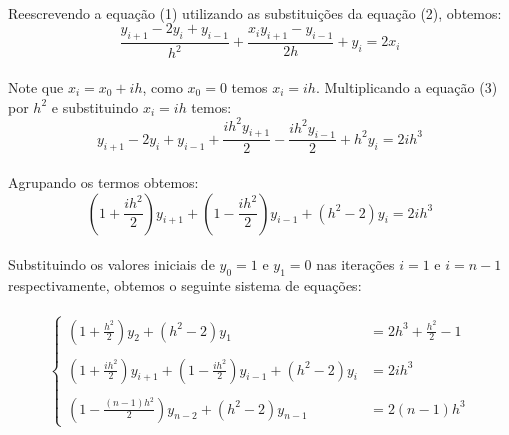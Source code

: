\documentclass{coursepaper}
\begin{document}
        \paragraph{}
            Reescrevendo a equação (1) utilizando as substituições da equação (2), obtemos:
            \begin{equation}
                \frac{y_{i+1} - 2y_{i} + y_{i-1}}{h^2} + \frac{x_{i} y_{i+1} - y_{i-1}}{2h} + y_{i} = 2x_{i}
            \end{equation}
        \paragraph{}
            Note que $x_{i} = x_{0} + ih$, como $x_{0} = 0$ temos $x_{i} = ih$. Multiplicando a equação (3) por $h^2$ e substituindo $x_{i}=ih$ temos:
            \begin{equation*}
                y_{i+1} - 2y_{i} + y_{i-1} + \frac{ih^2 y_{i+1}}{2} - \frac{ih^2 y_{i-1}}{2} + h^2y_{i} = 2ih^3
            \end{equation*}
        \paragraph{}
            Agrupando os termos obtemos:
            \begin{equation}
                (1+\frac{ih^2}{2})y_{i+1} + (1-\frac{ih^2}{2})y_{i-1} + (h^2-2)y_{i} = 2ih^3
            \end{equation}
        \paragraph{}
            Substituindo os valores iniciais de $y_{0} = 1$ e $y_{1} = 0$ nas iterações $i=1$ e $i=n-1$ respectivamente, obtemos o seguinte sistema de equações:\\ \\

            \begin{equation}
                \begin{cases}
                    \left(1+\frac{h^2}{2}\right)y_{2} + (h^2-2)y_{1} &= 2h^3 + \frac{h^2}{2} -1\\ \\
                    \left(1+\frac{ih^2}{2}\right)y_{i+1} + \left(1-\frac{ih^2}{2}\right)y_{i-1} + (h^2-2)y_{i} &= 2ih^3\\ \\
                    \left(1-\frac{(n-1)h^2}{2}\right)y_{n-2} + (h^2-2)y_{n-1} &= 2(n-1)h^3
                \end{cases}
            \end{equation}
\end{document}
